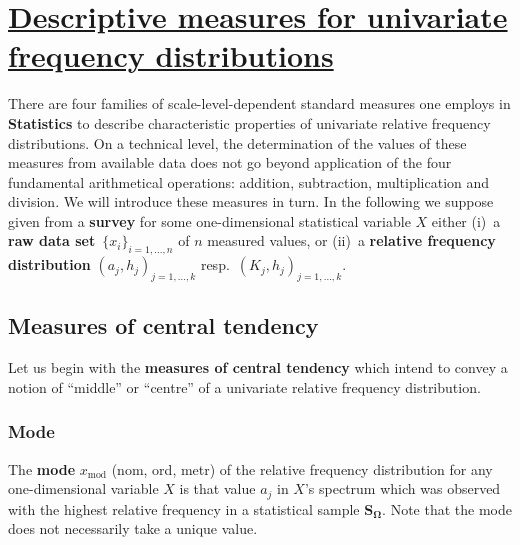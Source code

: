 \chapter[Measures for univariate distributions]{\href{https://www.youtube.com/watch?v=ssnLQRR4kus}{Descriptive measures for univariate frequency 
distributions}}
There are four families of scale-level-dependent standard measures 
one employs in \textbf{Statistics} to describe characteristic 
properties of univariate relative frequency distributions. On a 
technical level, the determination of the values of these measures 
from available data does not go beyond application of the four 
fundamental arithmetical operations: addition, subtraction, 
multiplication and division. We will introduce these measures in 
turn. In the following we suppose given from a \textbf{survey} for 
some one-dimensional statistical variable $X$ either (i)~a
\textbf{raw data set}~$\{x_{i}\}_{i=1,\ldots,n}$ of $n$ 
measured values, or (ii)~a \textbf{relative frequency distribution}
$(a_{j},h_{j})_{j=1,\ldots,k}$ resp.\ 
$(K_{j},h_{j})_{j=1,\ldots,k}$.

\section[Measures of central tendency]{Measures of central
tendency}
Let us begin with the \textbf{measures of central tendency} which 
intend to convey a notion of ``middle'' or ``centre'' of a 
univariate relative frequency distribution.

\subsection[Mode]{Mode}
The \textbf{mode} $x_\mathrm{mod}$ (nom, ord, metr) of the relative 
frequency distribution for any one-dimensional variable $X$ is that 
value $a_{j}$ in $X$'s spectrum which was observed with the 
highest relative frequency in a statistical sample 
$\boldsymbol{S_{\Omega}}$. Note that the mode does not necessarily 
take a unique value.

